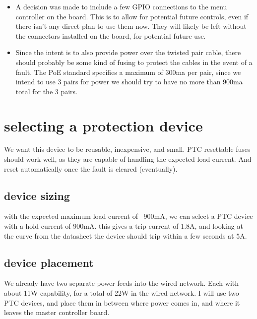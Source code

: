 \documentclass{article}
\begin{document}
\begin{itemize}
     \item A decision was made to include a few GPIO connections to the menu controller on the board.
     This is to allow for potential future controls, even if there isn't any direct plan to use them now.
     They will likely be left without the connectors installed on the board, for potential future use.
     
     \item Since the intent is to also provide power over the twisted pair cable, there should probably be some kind of fusing to protect the cables in the event of a fault.
     The PoE standard specifies a maximum of 300ma per pair, since we intend to use 3 pairs for power we should try to have no more than
     900ma total for the 3 pairs.
     
     \end{itemize}
     \section{selecting a protection device}
     We want this device to be reusable, inexpensive, and small.
     PTC resettable fuses should work well, as they are capable of handling the expected load current.
     And reset automatically once the fault is cleared (eventually).
     \subsection{device sizing}
     with the expected maximum load current of ~900mA, we can select a PTC device with a hold current of 900mA.
     this gives a trip current of 1.8A, and looking at the curve from the datasheet the device should trip within a few seconds at 5A.
     \subsection{device placement} 
     We already have two separate power feeds into the wired network.
     Each with about 11W capability, for a total of 22W in the wired network.
     I will use two PTC devices, and place them in between where power comes in, and where it leaves the master controller board.
\end{document}
